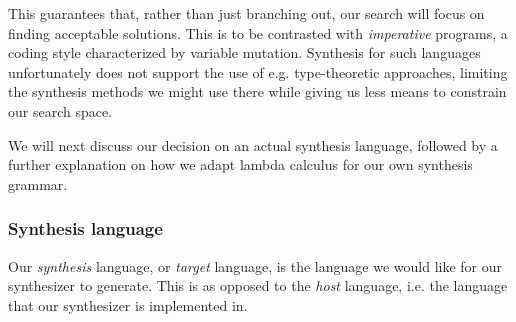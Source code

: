 \documentclass{article}
\begin{document}
This guarantees that, rather than just branching out,
our search will focus on finding acceptable solutions.
This is to be contrasted with \emph{imperative} programs,
a coding style characterized by variable mutation.
Synthesis for such languages
unfortunately
does not support the use of e.g. type-theoretic approaches,
limiting the synthesis methods we might use there
while giving us less means to constrain our search space.


We will next discuss 
our decision on an actual synthesis language,
followed by a further explanation on how we adapt lambda calculus for our own synthesis grammar.

\subsubsection{Synthesis language}

Our \emph{synthesis} language, or \emph{target} language,
is the language we would like for our synthesizer to generate.
This is as opposed to the \emph{host} language,
i.e. the language that our synthesizer is implemented in.
\end{document}
